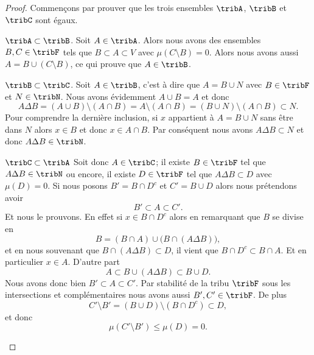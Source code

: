 \begin{proof}
    Commençons par prouver que les trois ensembles \( \tribA\), \( \tribB\) et \( \tribC\) sont égaux.
    \begin{subproof}
    \item[\( \tribA\subset\tribB\).]
        Soit \( A\in\tribA\). Alors nous avons des ensembles \( B,C\in\tribF \) tels que \( B\subset A\subset V\) avec \( \mu(C\setminus B)=0\). Alors nous avons aussi \( A=B\cup(C\setminus B)\), ce qui prouve que \( A\in\tribB\).
    \item[\( \tribB\subset\tribC\).] 
        Soit \( A\in\tribB\), c'est à dire que \( A=B\cup N\) avec \( B\in\tribF\) et \( N\in\tribN\). Nous avons évidemment \( A\cup B=A\) et donc
        \begin{equation}
            A\Delta B=(A\cup B)\setminus(A\cap B)=A\setminus(A\cap B)=(B\cup N)\setminus(A\cap B)\subset N.
        \end{equation}
        Pour comprendre la dernière inclusion, si \( x\) appartient à \( A=B\cup N\) sans être dans \( N\) alors \( x\in B\) et donc \( x\in A\cap B\). Par conséquent nous avons \( A\Delta B\subset N\) et donc \( A\Delta B\in\tribN\).
    \item[\( \tribC\subset\tribA\)]
        Soit donc \( A\in\tribC\); il existe \( B\in\tribF\) tel que \( A\Delta B\in\tribN\) ou encore, il existe \( D\in\tribF\) tel que \( A\Delta B\subset D\) avec \( \mu(D)=0\). Si nous posons \( B'=B\cap D^c\) et \( C'=B\cup D\) alors nous prétendons avoir
        \begin{equation}
            B'\subset A\subset C'.
        \end{equation}
        Et nous le prouvons. En effet si \( x\in B\cap D^c\) alors en remarquant que \( B\) se divise en 
        \begin{equation}
            B=(B\cap A)\cup\big(B\cap (A\Delta B)\big),
        \end{equation}
        et en nous souvenant que \( B\cap (A\Delta B)\subset D\), il vient que \( B\cap D^c\subset B\cap A\). Et en particulier \( x\in A\). D'autre part
        \begin{equation}
            A\subset B\cup(A\Delta B)\subset B\cup D.
        \end{equation}
        Nous avons donc bien \( B'\subset A\subset C'\). Par stabilité de la tribu \( \tribF\) sous les intersections et complémentaires nous avons aussi \( B',C'\in\tribF\). De plus
        \begin{equation}
            C'\setminus B'=(B\cup D)\setminus(B\cap D^c)\subset D,
        \end{equation}
         et donc
         \begin{equation}
             \mu(C'\setminus B')\leq \mu(D)=0.
         \end{equation}
    \end{subproof}


\end{proof}

